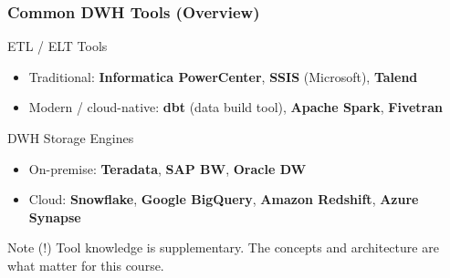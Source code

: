 \begin{frame}
  \frametitle{Common DWH Tools (Overview)}

  \begin{block}{ETL / ELT Tools}
    \begin{itemize}
      \item Traditional: \textbf{Informatica PowerCenter}, \textbf{SSIS} (Microsoft),
        \textbf{Talend}
      \item Modern / cloud-native: \textbf{dbt} (data build tool),
        \textbf{Apache Spark}, \textbf{Fivetran}
    \end{itemize}
  \end{block}

  \begin{block}{DWH Storage Engines}
    \begin{itemize}
      \item On-premise: \textbf{Teradata}, \textbf{SAP BW}, \textbf{Oracle DW}
      \item Cloud: \textbf{Snowflake}, \textbf{Google BigQuery},
        \textbf{Amazon Redshift}, \textbf{Azure Synapse}
    \end{itemize}
  \end{block}

  \begin{alertblock}{Note (!)}
    Tool knowledge is supplementary. The concepts and architecture
    are what matter for this course.
  \end{alertblock}

\end{frame}
